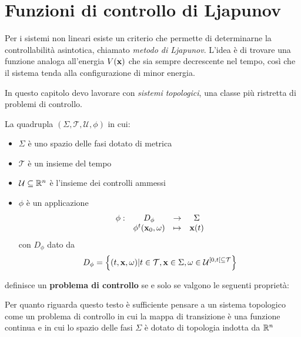 \section{Funzioni di controllo di Ljapunov}
Per i sistemi non lineari esiste un criterio che permette di determinarne
la controllabilità asintotica, chiamato \emph{metodo di Ljapunov}.
L'idea è di trovare una funzione analoga all'energia $V(\mathbf{x})$
che sia sempre decrescente nel tempo,
così che il sistema tenda alla configurazione di minor energia.

In questo capitolo devo lavorare con \emph{sistemi topologici},
una classe più ristretta di problemi di controllo.
\begin{definition}
La quadrupla $\left( \Sigma, \mathcal T, \mathcal U, \phi \right)$ in cui:
\begin{itemize}
    \item $\Sigma$ è uno spazio delle fasi dotato di metrica
    \item $\mathcal T$ è un insieme del tempo
    \item $\mathcal U \subseteq \mathbb{R}^n$ è l'insieme dei controlli ammessi
    \item $\phi$ è un applicazione
    \begin{equation*}
        \begin{array}{cccc}%
            \phi: &D_\phi &\to &\Sigma \\
            &\phi^t(\b x_0,\omega) &\mapsto &\b x(t)
        \end{array}%
    \end{equation*}
    con $D_\phi$ dato da
    \begin{equation*}
        D_\phi = \left\{(t, \mathbf{x}, \omega) | t \in \mathcal T, \mathbf{x} \in \Sigma, \omega \in \mathcal U^{[0, t[ \subseteq \mathcal T} \right\}
    \end{equation*}
\end{itemize}
definisce un \textbf{problema di controllo} se e solo se valgono le seguenti proprietà:
\label{def:sistema-topologico}
\end{definition}

Per quanto riguarda questo testo è sufficiente pensare a un sistema topologico
come un problema di controllo in cui la mappa di transizione è una funzione
continua e in cui lo spazio delle fasi $\Sigma$ è dotato di topologia indotta
da $\mathbb{R}^n$




